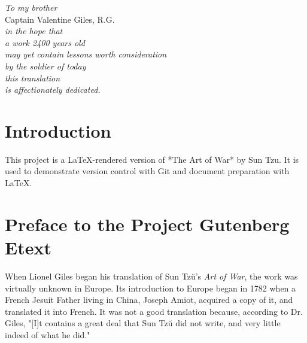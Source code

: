 \documentclass[10pt,a4paper]{book}
\begin{document}
\vspace{0em}

\noindent\hrulefill

\vspace{0em}

\begin{center}
\textit{To my brother} \\
\vspace{-0.3em}
Captain Valentine Giles, R.G. \\
\vspace{-0.3em}
\textit{in the hope that} \\
\vspace{-0.3em}
\textit{a work 2400 years old} \\
\vspace{-0.3em}
\textit{may yet contain lessons worth consideration} \\
\vspace{-0.3em}
\textit{by the soldier of today} \\
\vspace{-0.3em}
\textit{this translation} \\
\vspace{-0.3em}
\textit{is affectionately dedicated.}
\end{center}

\vspace{0em}

\noindent\hrulefill
\pagestyle{empty}

\newpage
\tableofcontents
\thispagestyle{empty}

\chapter*{Introduction}

This project is a LaTeX-rendered version of *The Art of War* by Sun Tzu. It is used to demonstrate version control with Git and document preparation with LaTeX.

\chapter*{Preface to the Project Gutenberg Etext}


When Lionel Giles began his translation of Sun Tzŭ’s \textit{Art of War}, the work was virtually unknown in Europe. Its introduction to Europe began in 1782 when a French Jesuit Father living in China, Joseph Amiot, acquired a copy of it, and translated it into French. It was not a good translation because, according to Dr. Giles, "[I]t contains a great deal that Sun Tzŭ did not write, and very little indeed of what he did." 
\end{document}
